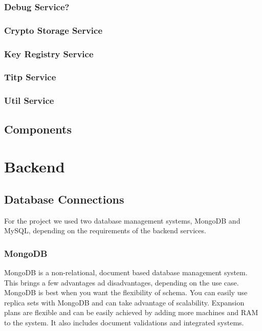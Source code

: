 
\subsubsection{Debug Service?}

\subsubsection{Crypto Storage Service}

\subsubsection{Key Registry Service}

\subsubsection{Titp Service}

\subsubsection{Util Service}

\subsection{Components}\label{subsec:components}


\section{Backend}\label{sec:backend}

\subsection{Database Connections}\label{subsec:database-connections}

For the project we used two database management systems, MongoDB and MySQL, depending on the requirements of the backend
services.

\subsubsection{MongoDB}
MongoDB is a non-relational, document based database management system.
This brings a few advantages ad disadvantages, depending on the use case.
MongoDB is best when you want the flexibility of schema.
You can easily use replica sets with MongoDB and can take advantage of scalability.
Expansion plans are flexible and can be easily achieved by adding more machines and RAM to the system.
It also includes document validations and integrated systems.

